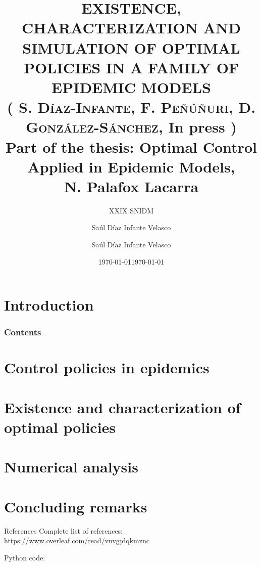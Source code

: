 \documentclass[10pt]{beamer}
\title{
    EXISTENCE, CHARACTERIZATION AND SIMULATION OF OPTIMAL
    POLICIES IN A FAMILY OF EPIDEMIC MODELS
    \\
        \small{
            (%
                \textsc{%
                    S. D\'iaz-Infante, %
                    F. Pe\~n\'u\~nuri, %
                    D. Gonz\'alez-S\'anchez}, In press%
            )\\%
        Part of the thesis:
        Optimal Control Applied in Epidemic Models,
        \\
        N. Palafox Lacarra
        \\
        }{}
}
\subtitle{XXIX SNIDM}
\date{\today}
\author{Sa\'ul D\'iaz Infante Velasco}
\institute{CONACYT-Universidad de Sonora}
\author[Sa\'ul D\'iaz Infante Velasco]{
        Sa\'ul D\'iaz Infante Velasco
    }
\date[\ccbyncsa]{\today }
\begin{document}
    \begin{frame}[plain]
        \maketitle
    \end{frame}
    \section{Introduction}
        
        \begin{frame}
            \frametitle{Contents}
            \tableofcontents
        \end{frame}
    \section{Control policies in epidemics}
        
        
    \section{Existence and characterization of optimal policies}
        
        
    \section{Numerical analysis}
    	
        
    \section{Concluding remarks}
        
    \begin{frame}{References}
    Complete list of references:
    \href{https://www.overleaf.com/read/vnvgjdqkmznc%
    }{https://www.overleaf.com/read/vnvgjdqkmznc}
    
    Python code:
    \nocite{python_repo}
    
    
\end{frame}
\end{document}
